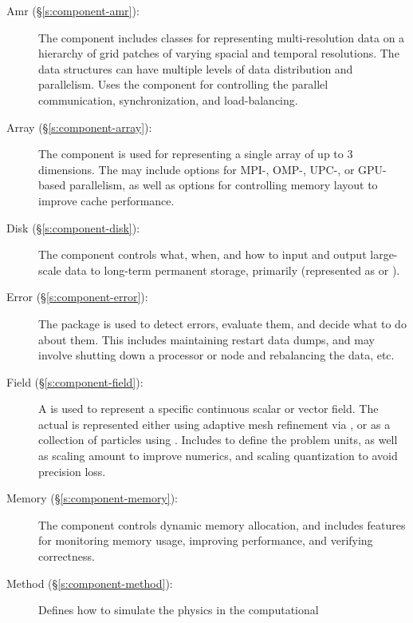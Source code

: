 \begin{description}
%
 \item [\todo Amr (\S\ref{s:component-amr}): ]
%
        The  component includes classes for representing
        multi-resolution data on a hierarchy of grid patches of
        varying spacial and temporal resolutions.  The  data
        structures can have multiple levels of data distribution and
        parallelism.  Uses the  component for
        controlling the parallel communication, synchronization, and
        load-balancing.
%
 \item [\todo Array (\S\ref{s:component-array}): ]
%
        The  component is used for representing a single
        array of up to $3$ dimensions.  The  may include
        options for MPI-, OMP-, UPC-, or GPU-based parallelism, as
        well as options for controlling memory layout to improve cache
        performance.
%
 \item [\todo Disk (\S\ref{s:component-disk}): ]
%
        The  component controls what, when, and how to
        input and output large-scale data to long-term permanent
        storage, primarily  (represented as
         or ).
%
 \item [\todo Error (\S\ref{s:component-error}): ]
%
        The  package is used to detect errors, evaluate
        them, and decide what to do about them.  This includes
        maintaining restart data dumps, and may involve shutting down
        a processor or node and rebalancing the data, etc.
%
 \item [\todo Field (\S\ref{s:component-field}): ]
%
        A  is used to represent a specific continuous
        scalar or vector field.  The actual  is
        represented either using adaptive mesh refinement via
        , or as a collection of particles using
        .  Includes  to define the problem
        units, as well as scaling amount to improve numerics, and
        scaling quantization to avoid precision loss.
%
 \item [\todo Memory (\S\ref{s:component-memory}): ]
%
        The  component controls dynamic memory
        allocation, and includes features for monitoring memory usage,
        improving performance, and verifying correctness.
%
 \item [\todo Method (\S\ref{s:component-method}): ]
%
        Defines how to simulate the physics in the computational

\end{description}
